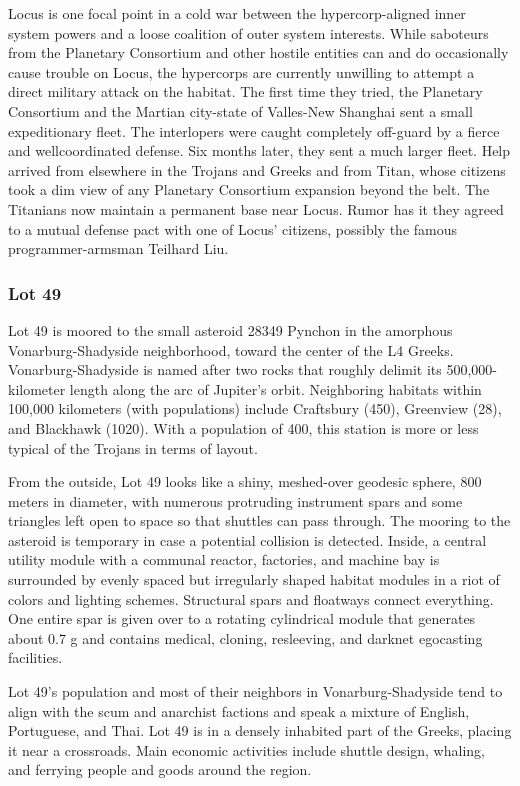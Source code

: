 Locus is one focal point in a cold war between the 
hypercorp-aligned inner system powers and a loose 
coalition of outer system interests. While saboteurs 
from the Planetary Consortium and other hostile 
entities can and do occasionally cause trouble on 
Locus, the hypercorps are currently unwilling to 
attempt a direct military attack on the habitat. The 
first time they tried, the Planetary Consortium and 
the Martian city-state of Valles-New Shanghai sent 
a small expeditionary fleet. The interlopers were 
caught completely off-guard by a fierce and wellcoordinated defense. Six months later, they sent a 
much larger fleet. Help arrived from elsewhere in the 
Trojans and Greeks and from Titan, whose citizens 
took a dim view of any Planetary Consortium expansion beyond the belt. The Titanians now maintain a permanent base near Locus. Rumor has it they 
agreed to a mutual defense pact with one of Locus' 
citizens, possibly the famous programmer-armsman 
Teilhard Liu.

\subsubsection{Lot 49}

Lot 49 is moored to the small asteroid 28349 Pynchon 
in the amorphous Vonarburg-Shadyside neighborhood, toward the center of the L4 Greeks. Vonarburg-Shadyside is named after two rocks that roughly 
delimit its 500,000-kilometer length along the arc of 
Jupiter's orbit. Neighboring habitats within 100,000 
kilometers (with populations) include Craftsbury 
(450), Greenview (28), and Blackhawk (1020). With a 
population of 400, this station is more or less typical 
of the Trojans in terms of layout.

From the outside, Lot 49 looks like a shiny, meshed-over geodesic sphere, 800 meters in diameter, with 
numerous protruding instrument spars and some 
triangles left open to space so that shuttles can pass 
through. The mooring to the asteroid is temporary in 
case a potential collision is detected. Inside, a central 
utility module with a communal reactor, factories, 
and machine bay is surrounded by evenly spaced but 
irregularly shaped habitat modules in a riot of colors 
and lighting schemes. Structural spars and floatways 
connect everything. One entire spar is given over to a 
rotating cylindrical module that generates about 0.7 g 
and contains medical, cloning, resleeving, and darknet 
egocasting facilities.

Lot 49's population and most of their neighbors 
in Vonarburg-Shadyside tend to align with the scum 
and anarchist factions and speak a mixture of English, 
Portuguese, and Thai. Lot 49 is in a densely inhabited 
part of the Greeks, placing it near a crossroads. Main 
economic activities include shuttle design, whaling, 
and ferrying people and goods around the region.

